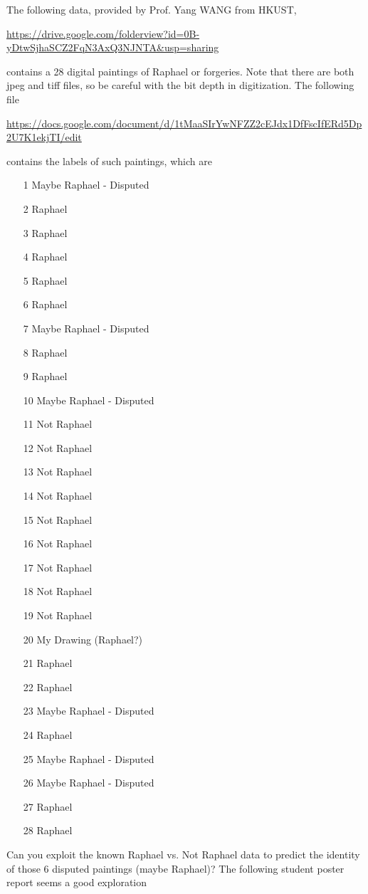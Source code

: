 \documentclass[11pt]{article}
\begin{document}
The following data, provided by Prof. Yang WANG from HKUST,

\url{https://drive.google.com/folderview?id=0B-yDtwSjhaSCZ2FqN3AxQ3NJNTA&usp=sharing}

\noindent contains a 28 digital paintings of Raphael or forgeries. Note that there are both jpeg and tiff files, so be careful with the bit depth in digitization. The following file

\url{https://docs.google.com/document/d/1tMaaSIrYwNFZZ2cEJdx1DfFscIfERd5Dp2U7K1ekjTI/edit}

\noindent contains the labels of such paintings, which are 
\begin{enumerate}
\item[1] Maybe Raphael - Disputed
\item[2] Raphael
\item[3] Raphael
\item[4] Raphael
\item[5] Raphael
\item[6] Raphael
\item[7] Maybe Raphael - Disputed
\item[8] Raphael
\item[9] Raphael
\item[10] Maybe Raphael - Disputed
\item[11] Not Raphael
\item[12] Not Raphael
\item[13] Not Raphael
\item[14] Not Raphael
\item[15] Not Raphael
\item[16] Not Raphael
\item[17] Not Raphael
\item[18] Not Raphael
\item[19] Not Raphael
\item[20] My Drawing (Raphael?)
\item[21] Raphael
\item[22] Raphael
\item[23] Maybe Raphael - Disputed
\item[24] Raphael
\item[25] Maybe Raphael - Disputed
\item[26] Maybe Raphael - Disputed
\item[27] Raphael
\item[28] Raphael
\end{enumerate}
Can you exploit the known Raphael vs. Not Raphael data to predict the identity of those 6 disputed paintings (maybe Raphael)? The following student poster report seems a good exploration
\end{document}
